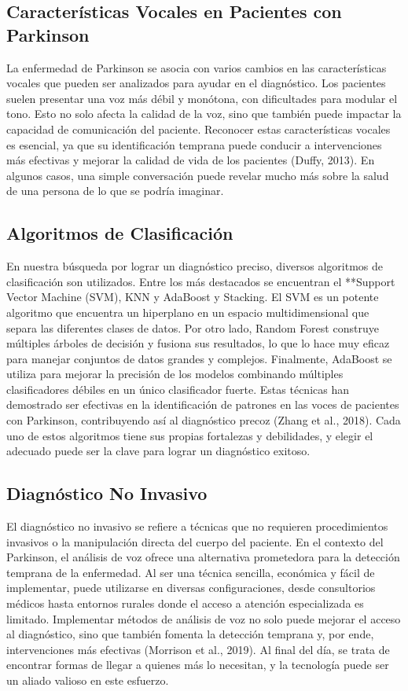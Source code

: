 \documentclass[listof=nochaptergap,12pt,times,authoryear]{report}
\begin{document}
\subsection{Características Vocales en Pacientes con Parkinson}
La enfermedad de Parkinson se asocia con varios cambios en las características vocales que pueden ser analizados para ayudar en el diagnóstico. Los pacientes suelen presentar una voz más débil y monótona, con dificultades para modular el tono. Esto no solo afecta la calidad de la voz, sino que también puede impactar la capacidad de comunicación del paciente. Reconocer estas características vocales es esencial, ya que su identificación temprana puede conducir a intervenciones más efectivas y mejorar la calidad de vida de los pacientes (Duffy, 2013). En algunos casos, una simple conversación puede revelar mucho más sobre la salud de una persona de lo que se podría imaginar.

\subsection{Algoritmos de Clasificación}
En nuestra búsqueda por lograr un diagnóstico preciso, diversos algoritmos de clasificación son utilizados. Entre los más destacados se encuentran el **Support Vector Machine (SVM), KNN y AdaBoost y Stacking. El SVM es un potente algoritmo que encuentra un hiperplano en un espacio multidimensional que separa las diferentes clases de datos. Por otro lado, Random Forest construye múltiples árboles de decisión y fusiona sus resultados, lo que lo hace muy eficaz para manejar conjuntos de datos grandes y complejos. Finalmente, AdaBoost se utiliza para mejorar la precisión de los modelos combinando múltiples clasificadores débiles en un único clasificador fuerte. Estas técnicas han demostrado ser efectivas en la identificación de patrones en las voces de pacientes con Parkinson, contribuyendo así al diagnóstico precoz (Zhang et al., 2018). Cada uno de estos algoritmos tiene sus propias fortalezas y debilidades, y elegir el adecuado puede ser la clave para lograr un diagnóstico exitoso.

\subsection{Diagnóstico No Invasivo}
El diagnóstico no invasivo se refiere a técnicas que no requieren procedimientos invasivos o la manipulación directa del cuerpo del paciente. En el contexto del Parkinson, el análisis de voz ofrece una alternativa prometedora para la detección temprana de la enfermedad. Al ser una técnica sencilla, económica y fácil de implementar, puede utilizarse en diversas configuraciones, desde consultorios médicos hasta entornos rurales donde el acceso a atención especializada es limitado. Implementar métodos de análisis de voz no solo puede mejorar el acceso al diagnóstico, sino que también fomenta la detección temprana y, por ende, intervenciones más efectivas (Morrison et al., 2019). Al final del día, se trata de encontrar formas de llegar a quienes más lo necesitan, y la tecnología puede ser un aliado valioso en este esfuerzo.
\end{document}
